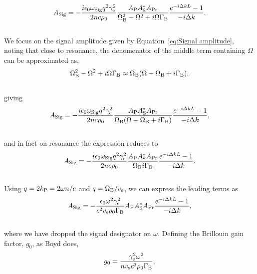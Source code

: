 \\
\begin{equation}
  A_{\rm Sig} = -\frac{i\epsilon_{0}\omega_{\rm Sig}q^{2}\gamma_{\rm e}^{2}}{2nc\rho_{0}}\frac{A_{\rm P}A_{\rm S}^{*}A_{\rm Pr}}{\Omega_{\rm B}^{2} - \Omega^{2} + i\Omega\Gamma_{\rm B}} \frac{e^{-i\Delta kL} - 1}{-i\Delta k}.
  \label{eq:Signal amplitude}
\end{equation}
\\
We focus on the signal amplitude given by Equation~\ref{eq:Signal amplitude}, noting that close to resonance, the denomenator of the middle term containing \(\Omega\) can be approximated as,
\\
\begin{equation}
\Omega_{\rm B}^{2} - \Omega^{2} + i\Omega\Gamma_{\rm B} \approx \Omega_{\rm B}(\Omega - \Omega_{\rm B} + i\Gamma_{\rm B}),
\end{equation}
\\
giving
\\
\begin{equation}
  A_{\rm Sig} = -\frac{i\epsilon_{0}\omega_{\rm Sig}q^{2}\gamma_{\rm e}^{2}}{2nc\rho_{0}}\frac{A_{\rm P}A_{\rm S}^{*}A_{\rm Pr}}{\Omega_{\rm B}(\Omega - \Omega_{\rm B} + i\Gamma_{\rm B})} \frac{e^{-i\Delta kL} - 1}{-i\Delta k},
  \label{eq:resonance}
\end{equation}
\\
and in fact on resonance the expression reduces to
\\
\begin{equation}
  A_{\rm Sig} = -\frac{i\epsilon_{0}\omega_{\rm Sig}q^{2}\gamma_{\rm e}^{2}}{2nc\rho_{0}}\frac{A_{\rm P}A_{\rm S}^{*}A_{\rm Pr}}{\Omega_{\rm B}i\Gamma_{\rm B}} \frac{e^{-i\Delta kL} - 1}{-i\Delta k}.
\end{equation}
\\
Using \(q = 2k_{\rm P} = 2\omega n/c\) and \(q = \Omega_{\rm B}/v_{\rm s}\), we can express the leading terms as
\\
\begin{equation}
  A_{\rm Sig} = -\frac{\epsilon_{0}\omega^{2}\gamma_{\rm e}^{2}}{c^{2}v_{\rm s}\rho_{0}\Gamma_{\rm B}}A_{\rm P}A_{\rm S}^{*}A_{\rm Pr} \frac{e^{-i\Delta kL} - 1}{-i\Delta k},
\end{equation}
\\
where we have dropped the signal designator on \(\omega\). Defining the Brillouin gain factor, \(g_{0}\), as Boyd does,
\\
\begin{equation}
  g_{0} = \frac{\gamma_{\rm e}^{2}\omega^{2}}{nv_{\rm s}c^{3}\rho_{0}\Gamma_{\rm B}},
\end{equation}

